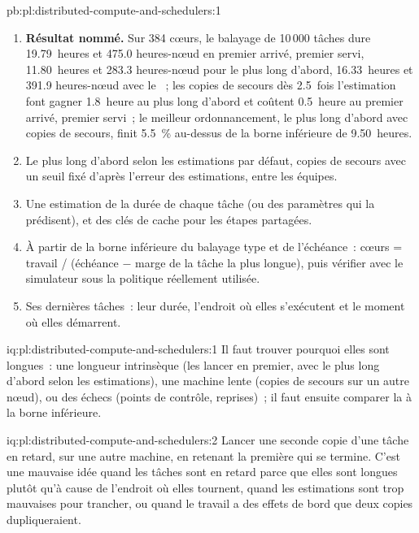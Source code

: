 \begin{solution}{pb:pl:distributed-compute-and-schedulers:1}
\begin{enumerate}
étapes de calcul des variables du balayage suivant (3\,475 heures-cœur, 10.3~heures).
\item \textbf{Résultat nommé.} Sur 384 cœurs, le balayage de 10\,000 tâches dure 19.79~heures et 475.0 heures-nœud en premier arrivé, premier servi, 11.80~heures et 283.3
heures-nœud pour le plus long d'abord, 16.33~heures et 391.9 heures-nœud avec le ~; les copies de secours dès 2.5~fois l'estimation font gagner 1.8~heure au plus long d'abord et coûtent 0.5~heure au premier arrivé,
premier servi~; le meilleur ordonnancement, le plus long d'abord avec copies de secours, finit 5.5~\% au-dessus de la borne inférieure de 9.50~heures.
\item Le plus long d'abord selon les estimations par défaut, copies de secours avec un seuil fixé d'après l'erreur des estimations,  entre les équipes.
\item Une estimation de la durée de chaque tâche (ou des paramètres qui la prédisent), et des clés de cache pour les étapes partagées.
\item À partir de la borne inférieure du balayage type et de l'échéance~: cœurs = travail / (échéance $-$ marge de la tâche la plus longue), puis vérifier avec le
simulateur sous la politique réellement utilisée.
\item Ses dernières tâches~: leur durée, l'endroit où elles s'exécutent et le moment où elles démarrent.
\end{enumerate}
\end{solution}

\begin{solution}{iq:pl:distributed-compute-and-schedulers:1}
Il faut trouver pourquoi elles sont longues~: une longueur intrinsèque (les lancer en premier, avec le plus long d'abord selon les estimations), une machine lente (copies de secours sur un autre nœud),
ou des échecs (points de contrôle, reprises)~; il faut ensuite comparer la  à la borne inférieure.
\end{solution}

\begin{solution}{iq:pl:distributed-compute-and-schedulers:2}
Lancer une seconde copie d'une tâche en retard, sur une autre machine, en retenant la première qui se termine. C'est une mauvaise idée quand les tâches sont en retard parce que
elles sont longues plutôt qu'à cause de l'endroit où elles tournent, quand les estimations sont trop mauvaises pour trancher, ou quand le travail a des effets de bord que deux copies
dupliqueraient.
\end{solution}

